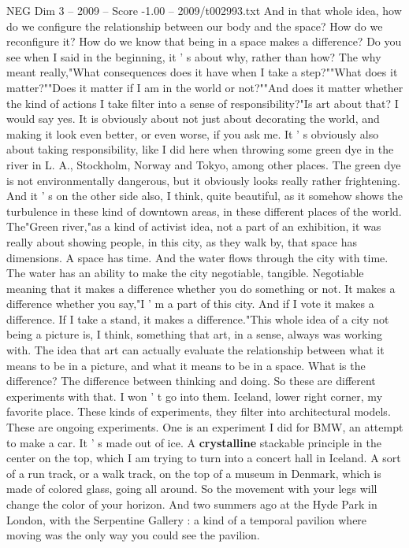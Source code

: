 \begin{textsample}{NEG Dim 3 – 2009 – Score -1.00 – 2009/t002993.txt}
And in that whole idea, how do we configure the relationship between our body and the space?
How do we reconfigure it?
How do we know that being in a space makes a difference?
Do you see when I said in the beginning, it ' s about why, rather than how?
The why meant really,"What consequences does it have when I take a step?""What does it matter?""Does it matter if I am in the world or not?""And does it matter whether the kind of actions I take filter into a sense of responsibility?"Is art about that?
I would say yes.
It is obviously about not just about decorating the world, and making it look even better, or even worse, if you ask me.
It ' s obviously also about taking responsibility, like I did here when throwing some green dye in the river in L.
A., Stockholm, Norway and Tokyo, among other places.
The green dye is not environmentally dangerous, but it obviously looks really rather frightening.
And it ' s on the other side also, I think, quite beautiful, as it somehow shows the turbulence in these kind of downtown areas, in these different places of the world.
The"Green river,"as a kind of activist idea, not a part of an exhibition, it was really about showing people, in this city, as they walk by, that space has dimensions.
A space has time.
And the water flows through the city with time.
The water has an ability to make the city negotiable, tangible.
Negotiable meaning that it makes a difference whether you do something or not.
It makes a difference whether you say,"I ' m a part of this city.
And if I vote it makes a difference.
If I take a stand, it makes a difference."This whole idea of a city not being a picture is, I think, something that art, in a sense, always was working with.
The idea that art can actually evaluate the relationship between what it means to be in a picture, and what it means to be in a space.
What is the difference?
The difference between thinking and doing.
So these are different experiments with that.
I won ' t go into them.
Iceland, lower right corner, my favorite place.
These kinds of experiments, they filter into architectural models.
These are ongoing experiments.
One is an experiment I did for BMW, an attempt to make a car.
It ' s made out of ice.
A \textbf{crystalline} stackable principle in the center on the top, which I am trying to turn into a concert hall in Iceland.
A sort of a run track, or a walk track, on the top of a museum in Denmark, which is made of colored glass, going all around.
So the movement with your legs will change the color of your horizon.
And two summers ago at the Hyde Park in London, with the Serpentine Gallery : a kind of a temporal pavilion where moving was the only way you could see the pavilion.

\end{textsample}

